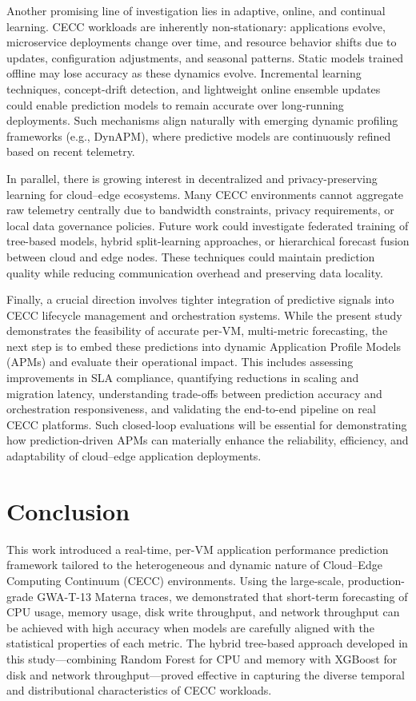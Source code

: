 \documentclass[a4paper,fleqn]{cas-dc}
\begin{document}
Another promising line of investigation lies in adaptive, online, and continual learning. CECC workloads are inherently non-stationary: applications evolve, microservice deployments change over time, and resource behavior shifts due to updates, configuration adjustments, and seasonal patterns. Static models trained offline may lose accuracy as these dynamics evolve. Incremental learning techniques, concept-drift detection, and lightweight online ensemble updates could enable prediction models to remain accurate over long-running deployments. Such mechanisms align naturally with emerging dynamic profiling frameworks (e.g., DynAPM), where predictive models are continuously refined based on recent telemetry.

In parallel, there is growing interest in decentralized and privacy-preserving learning for cloud--edge ecosystems. Many CECC environments cannot aggregate raw telemetry centrally due to bandwidth constraints, privacy requirements, or local data governance policies. Future work could investigate federated training of tree-based models, hybrid split-learning approaches, or hierarchical forecast fusion between cloud and edge nodes. These techniques could maintain prediction quality while reducing communication overhead and preserving data locality.

Finally, a crucial direction involves tighter integration of predictive signals into CECC lifecycle management and orchestration systems. While the present study demonstrates the feasibility of accurate per-VM, multi-metric forecasting, the next step is to embed these predictions into dynamic Application Profile Models (APMs) and evaluate their operational impact. This includes assessing improvements in SLA compliance, quantifying reductions in scaling and migration latency, understanding trade-offs between prediction accuracy and orchestration responsiveness, and validating the end-to-end pipeline on real CECC platforms. Such closed-loop evaluations will be essential for demonstrating how prediction-driven APMs can materially enhance the reliability, efficiency, and adaptability of cloud--edge application deployments.

\section{Conclusion}
\label{sec:conclusion}

This work introduced a real-time, per-VM application performance prediction framework tailored to the heterogeneous and dynamic nature of Cloud--Edge Computing Continuum (CECC) environments. Using the large-scale, production-grade GWA-T-13 Materna traces, we demonstrated that short-term forecasting of CPU usage, memory usage, disk write throughput, and network throughput can be achieved with high accuracy when models are carefully aligned with the statistical properties of each metric. The hybrid tree-based approach developed in this study---combining Random Forest for CPU and memory with XGBoost for disk and network throughput---proved effective in capturing the diverse temporal and distributional characteristics of CECC workloads.
\end{document}
